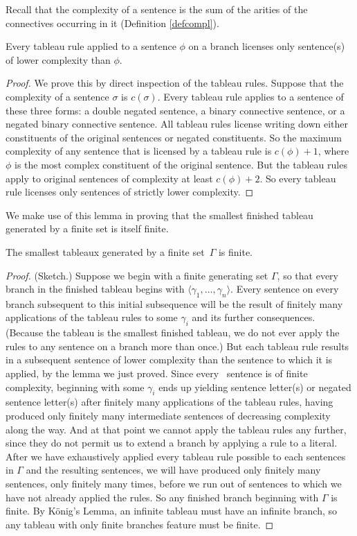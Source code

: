 Recall that the complexity of a sentence is the sum of the arities of the connectives occurring in it (Definition \ref{defcompl}). \begin{lemma}
	Every tableau rule applied to a sentence $\phi$ on a branch licenses only sentence(s) of lower complexity than $\phi$.
	\begin{proof}
		We prove this by direct inspection of the tableau rules.  Suppose that the complexity of a sentence $\sigma$ is $c(\sigma)$. Every tableau rule applies to a sentence of these three forms: a double negated sentence, a binary connective sentence, or a negated binary connective sentence. All tableau rules license writing down either constituents of the original sentences or negated constituents. So the maximum complexity of any sentence that is licensed by a tableau rule is $c(\phi)+1$, where $\phi$ is the most complex constituent of the original sentence. But the tableau rules apply to original sentences of complexity at least $c(\phi)+2$. So every tableau rule licenses only sentences of strictly lower complexity.
	\end{proof}
\end{lemma}


We make use of this lemma in proving that the smallest finished tableau generated by a finite set is itself finite. 
\begin{theorem}\label{fintab}
	The smallest tableaux generated by a finite set\, $\Gamma$ is finite. \begin{proof} (Sketch.)
		Suppose we begin with a finite generating set $\Gamma$, so that every branch in the finished tableau begins with $\langle \gamma_{1},…,\gamma_{n}\rangle$. Every sentence on every branch subsequent to this initial subsequence will be the result of finitely many applications of the tableau rules to some $\gamma_{i}$ and its further consequences. (Because the tableau is the smallest finished tableau, we do not ever apply the rules to any sentence on a branch more than once.)  But each tableau rule results in a subsequent sentence of lower complexity than the sentence to which it is applied, by the lemma we just proved. Since every \lone\ sentence is of finite complexity, beginning with some $\gamma_{i}$ ends up yielding sentence letter(s) or negated sentence letter(s) after finitely many applications of the tableau rules, having produced only finitely many intermediate sentences of decreasing complexity along the way. And at that point we cannot apply the tableau rules any further, since they do not permit us to extend a branch by applying a rule to a literal. After we have exhaustively applied every tableau rule possible to each sentences in $\Gamma$ and the resulting sentences, we will have produced only finitely many sentences, only finitely many times, before we run out of sentences to which we have not already applied the rules. So any finished branch beginning with $\Gamma$ is finite. By König's Lemma, an infinite tableau must have an infinite branch, so any tableau with only finite branches feature must be finite. 
	\end{proof}
\end{theorem}

